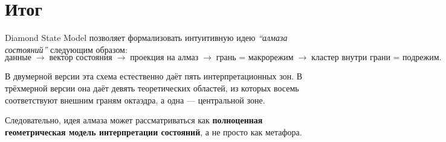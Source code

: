\documentclass[12pt,a4paper]{article}
\begin{document}
\section{Итог}
Diamond State Model позволяет формализовать интуитивную идею \textit{``алмаза состояний''} следующим образом:
\begin{equation}
\text{данные}
\;\to\;
\text{вектор состояния}
\;\to\;
\text{проекция на алмаз}
\;\to\;
\text{грань = макрорежим}
\;\to\;
\text{кластер внутри грани = подрежим}.
\end{equation}

В двумерной версии эта схема естественно даёт пять интерпретационных зон. В трёхмерной версии она даёт девять теоретических областей, из которых восемь соответствуют внешним граням октаэдра, а одна --- центральной зоне.

Следовательно, идея алмаза может рассматриваться как \textbf{полноценная геометрическая модель интерпретации состояний}, а не просто как метафора.
\end{document}
